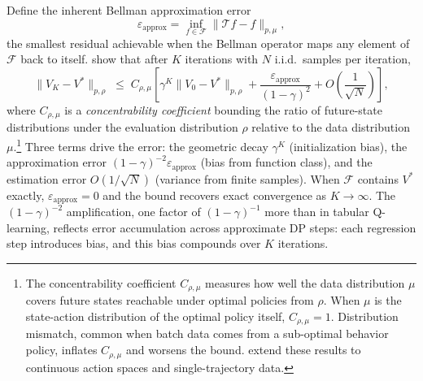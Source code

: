 Define the inherent Bellman approximation error
\begin{equation}
\varepsilon_{\mathrm{approx}} = \inf_{f \in \mathcal{F}} \| \mathcal{T} f - f \|_{p,\mu},
\end{equation}
the smallest residual achievable when the Bellman operator maps any element of $\mathcal{F}$ back to itself. \citet{MunosSzepesvari2008} show that after $K$ iterations with $N$ i.i.d.\ samples per iteration,
\begin{equation}
\| V_{K} - V^* \|_{p,\rho} \;\leq\; C_{\rho,\mu} \left[ \gamma^K \|V_0 - V^*\|_{p,\rho} + \frac{\varepsilon_{\mathrm{approx}}}{(1-\gamma)^2} + O\!\left(\frac{1}{\sqrt{N}}\right) \right],
\label{eq:fvi_error_bound}
\end{equation}
where $C_{\rho,\mu}$ is a \emph{concentrability coefficient} bounding the ratio of future-state distributions under the evaluation distribution $\rho$ relative to the data distribution $\mu$.\footnote{The concentrability coefficient $C_{\rho,\mu}$ measures how well the data distribution $\mu$ covers future states reachable under optimal policies from $\rho$. When $\mu$ is the state-action distribution of the optimal policy itself, $C_{\rho,\mu} = 1$. Distribution mismatch, common when batch data comes from a sub-optimal behavior policy, inflates $C_{\rho,\mu}$ and worsens the bound. \citet{Antos2008} extend these results to continuous action spaces and single-trajectory data.} Three terms drive the error: the geometric decay $\gamma^K$ (initialization bias), the approximation error $(1-\gamma)^{-2} \varepsilon_{\mathrm{approx}}$ (bias from function class), and the estimation error $O(1/\sqrt{N})$ (variance from finite samples). When $\mathcal{F}$ contains $V^*$ exactly, $\varepsilon_{\mathrm{approx}} = 0$ and the bound recovers exact convergence as $K \to \infty$. The $(1-\gamma)^{-2}$ amplification, one factor of $(1-\gamma)^{-1}$ more than in tabular Q-learning, reflects error accumulation across approximate DP steps: each regression step introduces bias, and this bias compounds over $K$ iterations.

